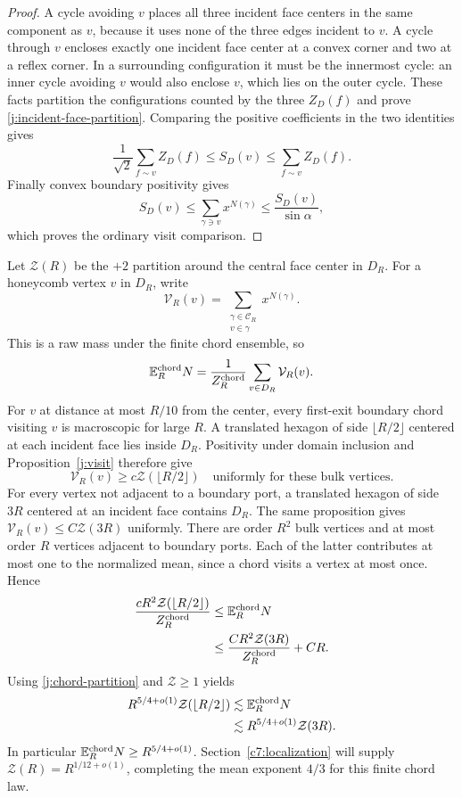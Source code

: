 \begin{proof}
A cycle avoiding $v$ places all three incident face centers in the same
component as $v$, because it uses none of the three edges incident to
$v$. A cycle through $v$ encloses exactly one incident face center at
a convex corner and two at a reflex corner. In a surrounding
configuration it must be the innermost cycle: an inner cycle avoiding
$v$ would also enclose $v$, which lies on the outer cycle. These facts
partition the configurations counted by the three $Z_D(f)$ and prove
\eqref{j:incident-face-partition}. Comparing the positive coefficients
in the two identities gives
\[
 \frac1{\sqrt2}\sum_{f\sim v}Z_D(f)\le S_D(v)
 \le\sum_{f\sim v}Z_D(f).
\]
Finally convex boundary positivity gives
\[
 S_D(v)\le\sum_{\gamma\ni v}x^{N(\gamma)}
 \le\frac{S_D(v)}{\sin\alpha},
\]
which proves the ordinary visit comparison.
\end{proof}

Let $\mathcal Z(R)$ be the $+2$ partition around the central face center
in $D_R$. For a honeycomb vertex $v$ in $D_R$, write
\[
 \mathcal V_R(v)=\sum_{\substack{\gamma\in\mathcal C_R\\v\in\gamma}}
                  x^{N(\gamma)}.
\]
This is a raw mass under the finite chord ensemble, so
\[
 \mathbb E_R^{\rm chord}N
 =\frac1{Z_R^{\rm chord}}\sum_{v\in D_R}\mathcal V_R(v).
\]
For $v$ at distance at most $R/10$ from the center, every first-exit
boundary chord visiting $v$ is macroscopic for large $R$. A translated
hexagon of side $\lfloor R/2\rfloor$ centered at each incident face lies
inside $D_R$. Positivity under domain inclusion and
Proposition~\ref{j:visit} therefore give
\[
 \mathcal V_R(v)\ge c\mathcal Z(\lfloor R/2\rfloor)
 \quad\text{uniformly for these bulk vertices}.
\]
For every vertex not adjacent to a boundary port, a translated hexagon
of side $3R$ centered at an incident face contains $D_R$. The same
proposition gives
$\mathcal V_R(v)\le C\mathcal Z(3R)$ uniformly. There are order $R^2$
bulk vertices and at most order $R$ vertices adjacent to boundary
ports. Each of the latter contributes at most one to the normalized
mean, since a chord visits a vertex at most once. Hence
\[
 \begin{aligned}
 \frac{cR^2\mathcal Z(\lfloor R/2\rfloor)}{Z_R^{\rm chord}}
 &\le\mathbb E_R^{\rm chord}N\\
 &\le\frac{CR^2\mathcal Z(3R)}{Z_R^{\rm chord}}+CR.
 \end{aligned}
\]
Using \eqref{j:chord-partition} and $\mathcal Z\ge1$ yields
\[
 \begin{aligned}
 R^{5/4+o(1)}\mathcal Z(\lfloor R/2\rfloor)
 &\lesssim \mathbb E_R^{\rm chord}N\\
 &\lesssim R^{5/4+o(1)}\mathcal Z(3R).
 \end{aligned}
\]
In particular $\mathbb E_R^{\rm chord}N\ge R^{5/4+o(1)}$.
Section~\ref{c7:localization} will supply
$\mathcal Z(R)=R^{1/12+o(1)}$, completing the mean exponent $4/3$ for
this finite chord law.
